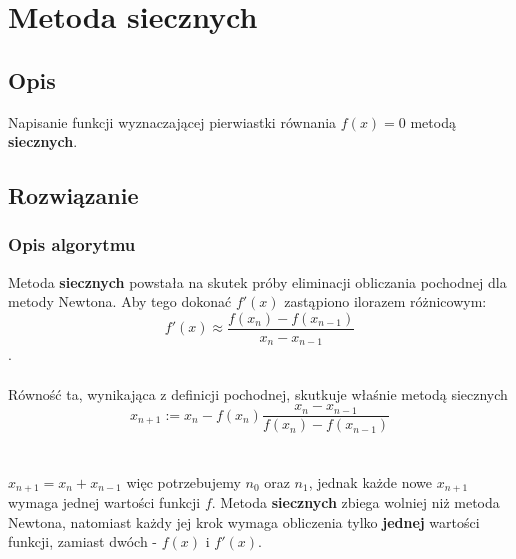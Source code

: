 \documentclass[10pt,a4paper, polish]{article}
\begin{document}
\section{Metoda siecznych}

\subsection*{Opis}
Napisanie funkcji wyznaczającej pierwiastki równania $f(x) = 0$ metodą \textbf{siecznych}.
\subsection*{Rozwiązanie}
\subsubsection*{Opis algorytmu}
Metoda \textbf{siecznych} powstała na skutek próby eliminacji obliczania pochodnej dla metody Newtona. Aby tego dokonać $f'(x)$ zastąpiono ilorazem różnicowym: $$f'(x) \approx \dfrac{f(x_n)-f(x_{n-1})}{x_n-x_{n-1}}$$.\\\\ Równość ta, wynikająca z definicji pochodnej, skutkuje właśnie metodą siecznych $$x_{n+1} := x_n - f(x_n)\dfrac{x_n-x_{n-1}}{f(x_n)-f(x_{n-1})}$$\\\\
$x_{n+1} = x_n + x_{n-1}$ więc potrzebujemy $n_0$ oraz $n_1$, jednak każde nowe $x_{n+1}$ wymaga jednej wartości funkcji $f$. Metoda \textbf{siecznych} zbiega wolniej niż metoda Newtona, natomiast każdy jej krok wymaga obliczenia tylko \textbf{jednej} wartości funkcji, zamiast dwóch - $f(x)$ i $f'(x)$.
\end{document}
